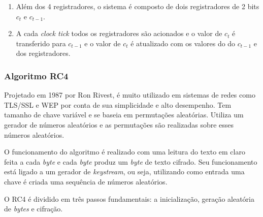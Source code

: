 \begin{enumerate}
	\item Além dos 4 registradores, o sistema é composto de dois registradores de 2 bits $c_t$ e $c_{t-1}$.
	\item A cada \textit{clock tick} todos os registradores são acionados e o valor de $ c_t $ é transferido para $ c_{t-1}$ e o valor de $ c_t$ é atualizado com os valores do do $ c_{t-1}$ e dos registradores.
\end{enumerate}

\subsubsection{Algoritmo RC4}
\label{algorithm-rc4}

Projetado em 1987 por Ron Rivest, é muito utilizado em sistemas de redes como TLS/SSL e WEP por conta de sua simplicidade e alto desempenho. Tem tamanho de chave variável e se baseia em permutações aleatórias. Utiliza um gerador de números aleatórios e as permutações são realizadas sobre esses números aleatórios.

O funcionamento do algoritmo é realizado com uma leitura do texto em claro feita a cada \textit{byte} e cada \textit{byte} produz um \textit{byte} de texto cifrado. Seu funcionamento está ligado a um gerador de \textit{keystream}, ou seja, utilizando como entrada uma chave é criada uma sequência de números aleatórios.

O RC4 é dividido em três passos fundamentais: a inicialização, geração aleatória de \textit{bytes} e cifração.

